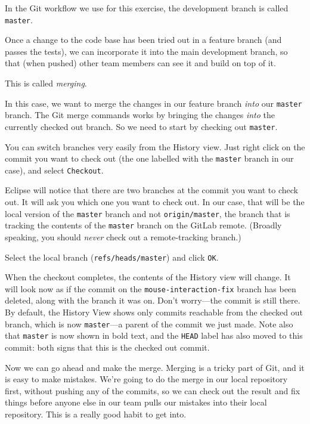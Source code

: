 \documentclass[
]{book}
\begin{document}
In the Git workflow we use for this exercise, the development branch is called \texttt{master}.

Once a change to the code base has been tried out in a feature branch (and passes the tests), we can incorporate it into the main development branch, so that (when pushed) other team members can see it and build on top of it.

This is called \emph{merging}.

In this case, we want to merge the changes in our feature branch \emph{into} our \texttt{master} branch. The Git merge commands works by bringing the changes \emph{into} the currently checked out branch. So we need to start by checking out \texttt{master}.

You can switch branches very easily from the History view. Just right click on the commit you want to check out (the one labelled with the \texttt{master} branch in our case), and select \texttt{Checkout}.

Eclipse will notice that there are two branches at the commit you want to check out. It will ask you which one you want to check out. In our case, that will be the local version of the \texttt{master} branch and not \texttt{origin/master}, the branch that is tracking the contents of the \texttt{master} branch on the GitLab remote. (Broadly speaking, you should \emph{never} check out a remote-tracking branch.)

Select the local branch (\texttt{refs/heads/master}) and click \texttt{OK}.

When the checkout completes, the contents of the History view will change. It will look now as if the commit on the \texttt{mouse-interaction-fix} branch has been deleted, along with the branch it was on. Don't worry---the commit is still there. By default, the History View shows only commits reachable from the checked out branch, which is now \texttt{master}---a parent of the commit we just made. Note also that \texttt{master} is now shown in bold text, and the \texttt{HEAD} label has also moved to this commit: both signs that this is the checked out commit.

Now we can go ahead and make the merge. Merging is a tricky part of Git, and it is easy to make mistakes. We're going to do the merge in our local repository first, without pushing any of the commits, so we can check out the result and fix things before anyone else in our team pulls our mistakes into their local repository. This is a really good habit to get into.
\end{document}
